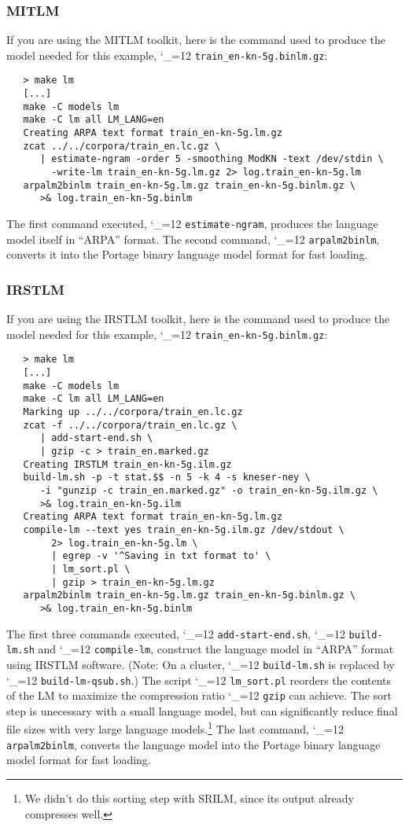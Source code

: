 \documentclass[11pt,letterpaper]{article}
\def\code{\begingroup\catcode`\_=12 \codex}
\newcommand{\codex}[1]{\texttt{#1}\endgroup}
\begin{document}
\subsubsection{MITLM}

If you are using the MITLM toolkit, here is the command used to produce the
model needed for this example, \code{train_en-kn-5g.binlm.gz}:
\begin{small}
\begin{verbatim}
   > make lm
   [...]
   make -C models lm
   make -C lm all LM_LANG=en
   Creating ARPA text format train_en-kn-5g.lm.gz
   zcat ../../corpora/train_en.lc.gz \
      | estimate-ngram -order 5 -smoothing ModKN -text /dev/stdin \
        -write-lm train_en-kn-5g.lm.gz 2> log.train_en-kn-5g.lm
   arpalm2binlm train_en-kn-5g.lm.gz train_en-kn-5g.binlm.gz \
      >& log.train_en-kn-5g.binlm
\end{verbatim}
\end{small}
The first command executed, \code{estimate-ngram}, produces the language
model itself in ``ARPA'' format.  The second command, \code{arpalm2binlm},
converts it into the Portage binary language model format for fast loading.


\subsubsection{IRSTLM}

If you are using the IRSTLM toolkit, here is the command used to produce the
model needed for this example, \code{train_en-kn-5g.binlm.gz}:
\begin{small}
\begin{verbatim}
   > make lm
   [...]
   make -C models lm
   make -C lm all LM_LANG=en
   Marking up ../../corpora/train_en.lc.gz
   zcat -f ../../corpora/train_en.lc.gz \
      | add-start-end.sh \
      | gzip -c > train_en.marked.gz
   Creating IRSTLM train_en-kn-5g.ilm.gz
   build-lm.sh -p -t stat.$$ -n 5 -k 4 -s kneser-ney \
      -i "gunzip -c train_en.marked.gz" -o train_en-kn-5g.ilm.gz \
      >& log.train_en-kn-5g.ilm
   Creating ARPA text format train_en-kn-5g.lm.gz
   compile-lm --text yes train_en-kn-5g.ilm.gz /dev/stdout \
        2> log.train_en-kn-5g.lm \
        | egrep -v '^Saving in txt format to' \
        | lm_sort.pl \
        | gzip > train_en-kn-5g.lm.gz
   arpalm2binlm train_en-kn-5g.lm.gz train_en-kn-5g.binlm.gz \
      >& log.train_en-kn-5g.binlm
\end{verbatim}
\end{small}
The first three commands executed, \code{add-start-end.sh},
\code{build-lm.sh} and \code{compile-lm}, construct the language model
in ``ARPA'' format using IRSTLM software. (Note: On a cluster,
\code{build-lm.sh} is replaced by \code{build-lm-qsub.sh}.) The script
\code{lm_sort.pl} reorders the contents of the LM to maximize the compression
ratio \code{gzip} can achieve. The sort step is unecessary with a small
language model, but can significantly reduce final file sizes with very large
language models.\footnote{We didn't do this sorting step with SRILM,
since its output already compresses well.} The last command,
\code{arpalm2binlm}, converts the language model into the Portage binary
language model format for fast loading.
\end{document}
